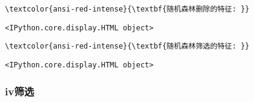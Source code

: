 \documentclass[11pt]{article}
\begin{document}
    \begin{Verbatim}[commandchars=\\\{\}]
\textcolor{ansi-red-intense}{\textbf{随机森林删除的特征: }}

    \end{Verbatim}

    
    \begin{verbatim}
<IPython.core.display.HTML object>
    \end{verbatim}

    
    \begin{Verbatim}[commandchars=\\\{\}]
\textcolor{ansi-red-intense}{\textbf{随机森林筛选的特征: }}

    \end{Verbatim}

    
    \begin{verbatim}
<IPython.core.display.HTML object>
    \end{verbatim}

    
    \subsubsection{iv筛选}\label{ivux7b5bux9009}
\end{document}
